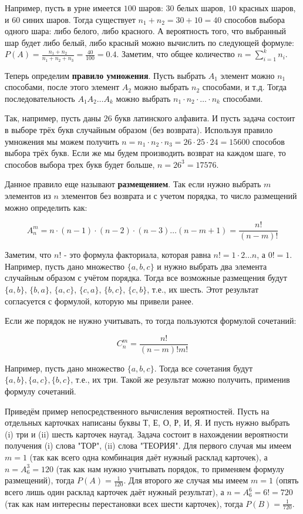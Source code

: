 Например, пусть в урне имеется $100$ шаров: $30$ белых шаров, $10$
красных шаров, и $60$ синих шаров. Тогда существует 
$n_1 + n_2 = 30 + 10 = 40$ способов выбора одного шара: либо белого, 
либо красного. А вероятность того, что выбранный шар будет либо 
белый, либо красный можно вычислить по следующей формуле:
$P(A)=\frac{n_1+n_2}{n_1+n_2+n_3} = \frac{40}{100} = 0.4$.
Заметим, что общее количество $n=\sum_{i=1}^kn_i$. 

Теперь определим \textbf{правило умножения}. Пусть выбрать $A_1$ элемент можно
$n_1$ способами, после этого элемент $A_2$ можно выбрать $n_2$ способами,
и т.д. Тогда последовательность $A_1 A_2 \ldots A_k$ можно выбрать 
$n_1 \cdot n_2 \cdot \ldots \cdot n_k$ способами.

Так, например, пусть даны $26$ букв латинского алфавита. И пусть задача 
состоит в выборе трёх букв случайным образом (без возврата). Используя правило 
умножения мы можем получить $n=n_1 \cdot n_2 \cdot n_3 = 26 \cdot 25 \cdot 24 = 15600$ 
способов выбора трёх букв. Если же мы будем производить возврат на каждом шаге, то способов
выбора трех букв будет больше, $n=26^3=17576$.

Данное правило еще называют \textbf{размещением}. Так если нужно выбрать $m$ элементов
из $n$ элементов без возврата и с учетом порядка, то число размещений можно определить как:

$$A_n^m=n\cdot(n-1)\cdot(n-2)\cdot(n-3)\ldots(n-m+1)=\frac{n!}{(n-m)!}$$

Заметим, что $n!$ - это формула факториала, которая равна $n!=1\cdot 2 \ldots n$, а $0!=1$.
Например, пусть дано множество $\{a, b, c\}$ и нужно выбрать два элемента случайным образом
с учётом порядка. Тогда все возможные размещения будут $\{a, b\}$, $\{b, a\}$, $\{a, c\}$, 
$\{c, a\}$, $\{b, c\}$, $\{c, b\}$, т.е., их шесть. Этот результат согласуется с 
формулой, которую мы привели ранее. 

Если же порядок не нужно учитывать, то тогда пользуются формулой сочетаний:

$$C_n^m=\frac{n!}{(n-m)!m!}$$

Например, пусть дано множество $\{a, b, c\}$. Тогда все сочетания будут 
$\{a, b\}, \{a, c\}, \{b, c\}$, т.е., их три. Такой же результат можно получить,
применив формулу сочетаний.

Приведём пример непосредственного вычисления вероятностей. Пусть на отдельных карточках
написаны буквы Т, Е, О, Р, И, Я. И пусть нужно выбрать (i) три и (ii) шесть карточек наугад. 
Задача состоит в нахождении вероятности получения (i) слова "ТОР", (ii) слова "ТЕОРИЯ".
Для первого случая мы имеем $m=1$ (так как всего одна комбинация даёт нужный 
расклад карточек), а $n=A_6^3=120$ (так как нам нужно учитывать порядок, то 
применяем формулу размещений), тогда $P(A)=\frac{1}{120}$. Для
второго же случая мы имеем $m=1$ (опять всего лишь один расклад карточек
даёт нужный результат), а $n=A_6^6=6!=720$ (так как нам интересны перестановки 
всех шести карточек), тогда $P(B)=\frac{1}{720}$.

